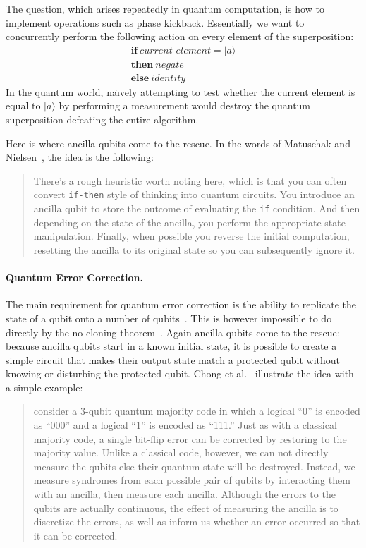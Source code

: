 \documentclass[sigplan,10pt,review,anonymous]{acmart}
\newcommand{\ket}[1]{|#1\rangle}
\begin{document}
The question, which arises repeatedly in quantum computation, is how
to implement operations such as phase kickback. Essentially we want to
concurrently perform the following action on every element of the
superposition:
\[\begin{array}{l}
  \textbf{if}~\textit{current-element}=\ket{a} \\
  \textbf{then}~\textit{negate} \\
  \textbf{else}~\textit{identity}
\end{array}\]
In the quantum world, na\"\i vely attempting to test whether the
current element is equal to $\ket{a}$ by performing a measurement would
destroy the quantum superposition defeating the entire algorithm.

Here is where ancilla qubits come to the rescue. In the words of
Matuschak and Nielsen~\cite{howgrover}, the idea is the following:
\begin{quote}
  There's a rough heuristic worth noting here, which is that you can
  often convert \verb|if-then| style of thinking into quantum
  circuits. You introduce an ancilla qubit to store the outcome of
  evaluating the \verb|if| condition. And then depending on the state
  of the ancilla, you perform the appropriate state
  manipulation. Finally, when possible you reverse the initial
  computation, resetting the ancilla to its original state so you can
  subsequently ignore it.
\end{quote}

\paragraph*{Quantum Error Correction.} The main requirement for
quantum error correction is the ability to replicate the state of a
qubit onto a number of qubits~\cite[Ch.~3]{NAP25196}. This is however
impossible to do directly by the no-cloning theorem~\cite{XXX}. Again ancilla
qubits come to the rescue: because ancilla qubits start in a known
initial state, it is possible to create a simple circuit that makes
their output state match a protected qubit without knowing or
disturbing the protected qubit. Chong et al.~\cite{sigarchblog}
illustrate the idea with a simple example:
\begin{quote}
consider a 3-qubit quantum majority code in which a logical ``0'' is
encoded as ``000'' and a logical ``1'' is encoded as ``111.''  Just as with
a classical majority code, a single bit-flip error can be corrected by
restoring to the majority value.  Unlike a classical code, however, we
can not directly measure the qubits else their quantum state will be
destroyed.  Instead, we measure syndromes from each possible pair of
qubits by interacting them with an ancilla, then measure each ancilla.
Although the errors to the qubits are actually continuous, the effect
of measuring the ancilla is to discretize the errors, as well as
inform us whether an error occurred so that it can be corrected.  
\end{quote}
\end{document}
